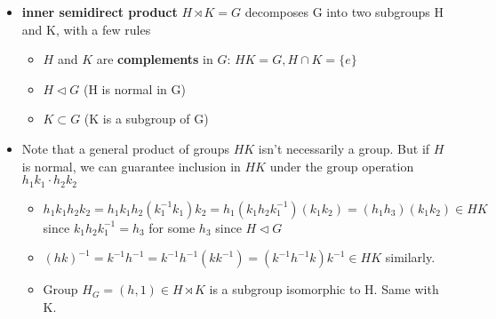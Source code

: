 \documentclass[11pt, oneside]{article}   	%
\begin{document}
\begin{itemize}
 \item \textbf{inner semidirect product} $H \rtimes K = G$ decomposes G into two subgroups H and K, with a few rules
   \begin{itemize}
   \item $H$ and $K$ are \textbf{complements} in $G$: $HK = G, H \cap K = \{e\}$
   \item $H \triangleleft G$ (H is normal in G)
   \item $K \subset G$ (K is a subgroup of G)
   \end{itemize}
 \item Note that a general product of groups $HK$ isn't necessarily a group.  But if $H$ is normal, we can guarantee inclusion in $HK$ under the group operation $h_1k_1 \cdot h_2k_2$
 \begin{itemize}
 \item $h_1k_1h_2k_2 = h_1k_1h_2(k_1^{-1}k_1)k_2 = h_1(k_1h_2k_1^{-1})(k_1k_2) = (h_1h_3)(k_1k_2) \in HK$ since $k_1h_2k_1^{-1} = h_3$ for some $h_3$ since $H \triangleleft G$
 \item $(hk)^{-1} = k^{-1}h^{-1}= k^{-1}h^{-1}(kk^{-1}) = (k^{-1}h^{-1}k)k^{-1} \in HK$ similarly.
 \item Group $H_G = (h,1) \in H \rtimes K$ is a subgroup isomorphic to H.  Same with K.
 

\end{itemize}
\end{itemize}
\end{document}
